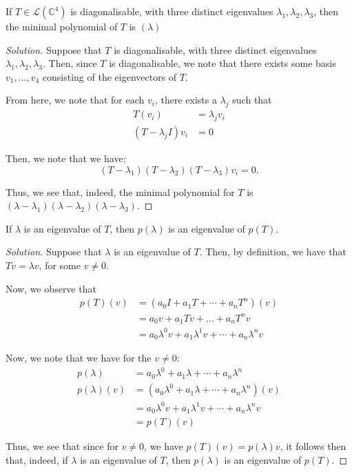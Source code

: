 \documentclass[openany]{book}
\newenvironment{solution}{\begin{proof}[Solution]}{\end{proof}}
\newcommand{\CC}{\mathbb{C}}
\begin{document}
\begin{hw}
	If $T \in \mathcal L(\CC^{4})$ is diagonalisable, with three distinct eigenvalues $\lambda_1, \lambda_2, \lambda_3$, then the minimal polynomial of $T$ is $(\lambda)$
\end{hw}
\begin{solution}
	Suppose that $T$ is diagonalisable, with three distinct eigenvalues $\lambda_1, \lambda_2, \lambda_3$. Then, since $T$ is diagonalisable, we note that there exists some basis $v_{1}, \ldots, v_{4}$ consisting of the eigenvectors of $T$.
	
	From here, we note that for each $v_{i}$, there exists a $\lambda_j$ such that
	\begin{align*}
		T(v_{i}) &= \lambda_{j} v_{i} \\
		(T - \lambda_j I)v_{i} &= 0
	\end{align*}

	Then, we note that we have:
	\begin{equation*}
		(T-\lambda_1)(T-\lambda_{2})(T-\lambda_3)v_{i} = 0.
	\end{equation*}

	Thus, we see that, indeed, the minimal polynomial for $T$ is $(\lambda - \lambda_1)(\lambda - \lambda_{2})(\lambda - \lambda_3)$.
\end{solution}


\begin{hw}
	If $\lambda$ is an eigenvalue of $T$, then $p(\lambda)$ is an eigenvalue of $p(T)$.
\end{hw}
\begin{solution}
	Suppose that $\lambda$ is an eigenvalue of $T$. Then, by definition, we have that $Tv = \lambda v$, for some $v \neq 0$.
	
	Now, we observe that
	\begin{align*}
		p(T)(v) &= (a_{0}I + a_{1}T + \cdots + a_{n}T^{n})(v) \\
		&= a_{0}v + a_{1}Tv + \ldots + a_{n}T^{n}v \\
		&= a_{0}\lambda^{0}v + a_{1}\lambda^{1} v + \cdots + a_{n}\lambda^{n}v 
	\end{align*}

	Now, we note that we have for the $v \neq 0$:
	\begin{align*}
		p(\lambda) &= a_{0}\lambda^{0} + a_{1}\lambda + \cdots + a_{n}\lambda^{n} \\
		p(\lambda)(v) &= (a_{0}\lambda^{0} + a_{1}\lambda + \cdots + a_{n}\lambda^{n})(v) \\
		&= a_{0}\lambda^{0}v + a_{1}\lambda^{1}v + \cdots + a_{n}\lambda^{n}v \\
		&= p(T)(v)
	\end{align*}

	Thus, we see that since for $v \neq 0$, we have $p(T)(v) = p(\lambda)v$, it follows then that, indeed, if $\lambda$ is an eigenvalue of $T$, then $p(\lambda)$ is an eigenvalue of $p(T)$.
\end{solution}
\end{document}
